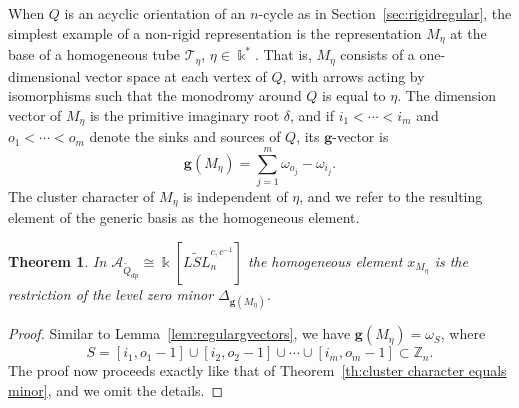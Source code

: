 \documentclass[12pt]{amsart}
\newcommand{\cA}{\mathcal{A}}
\newcommand{\ZZ}{\mathbb{Z}}
\newcommand{\kk}{\Bbbk}
\newcommand{\bfg}{\mathbf{g}}
\newcommand{\grep}{\bfg}
\newcommand{\Qdp}{\widetilde{Q}_{dp}}
\newcommand{\Qrep}{M}
\newtheorem{theorem}{Theorem}[section]
\theoremstyle{remark}
\numberwithin{equation}{section}
\numberwithin{figure}{section}
\begin{document}
When $Q$ is an acyclic orientation of an $n$-cycle as in Section~\ref{sec:rigidregular}, the simplest example of a non-rigid representation is the representation $\Qrep_\eta$ at the base of a homogeneous tube $\mathcal{T}_\eta$, $\eta \in \kk^*$.
That is, $\Qrep_\eta$ consists of a one-dimensional vector space at each vertex of $Q$, with arrows acting by isomorphisms such that the monodromy around $Q$ is equal to $\eta$.
The dimension vector of $\Qrep_\eta$ is the primitive imaginary root $\delta$, and if $i_1<\cdots<i_m$ and $o_1<\cdots < o_m$ denote the sinks and sources of $Q$, its $\bfg$-vector is 
\[
  \grep(\Qrep_\eta) = \sum_{j=1}^m \omega_{o_j} - \omega_{i_j}.
\]
The cluster character of $\Qrep_\eta$ is independent of $\eta$, and we refer to the resulting element of the generic basis as the homogeneous element.

\begin{theorem}
  \label{thm:homogeneous}
  In $\cA_{\Qdp} \cong \kk[\widetilde{LSL}_n^{c,c^{-1}}]$ the homogeneous element $x_{\Qrep_\eta}$ is the restriction of the level zero minor $\Delta_{\grep(\Qrep_\eta)}$.
\end{theorem}
\begin{proof}
  Similar to Lemma~\ref{lem:regulargvectors}, we have $\grep(\Qrep_\eta) = \omega_S$, where
  \[
    S=[i_1,o_1-1] \cup [i_2,o_2-1] \cup \cdots \cup [i_m,o_m-1] \subset \ZZ_n.
  \]
  The proof now proceeds exactly like that of Theorem~\ref{th:cluster character equals minor}, and we omit the details.
\end{proof}
\end{document}
